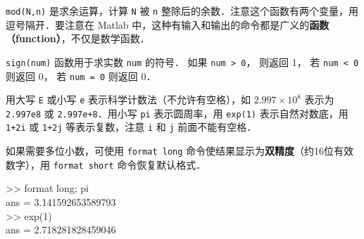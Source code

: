 \texttt{mod(N,n)} 是求余运算，计算 \texttt{N} 被 \texttt{n} 整除后的余数．注意这个函数有两个变量，用逗号隔开．要注意在 Matlab 中，这种有输入和输出的命令都是广义的\textbf{函数（function）}，不仅是数学函数．

\texttt{sign(num)} 函数用于求实数 \texttt{num} 的符号． 如果 \texttt{num > 0}， 则返回 1， 若 \texttt{num < 0} 则返回 0， 若 \texttt{num = 0} 则返回 0．

用大写 \texttt{E} 或小写 \texttt{e} 表示科学计数法（不允许有空格），如 $2.997\times 10^8$ 表示为 \texttt{2.997e8} 或 \texttt{2.997e+8}．用小写 \texttt{pi} 表示圆周率，用 \texttt{exp(1)} 表示自然对数底，用 \texttt{1+2i} 或 \texttt{1+2j} 等表示复数，注意 \texttt{i} 和 \texttt{j} 前面不能有空格．

如果需要多位小数，可使用 \texttt{format long} 命令使结果显示为\textbf{双精度}（约16位有效数字），用 \texttt{format short} 命令恢复默认格式．
\begin{Command}
>> format long; pi \\
ans = 3.141592653589793 \\
>> exp(1) \\
ans = 2.718281828459046
\end{Command}